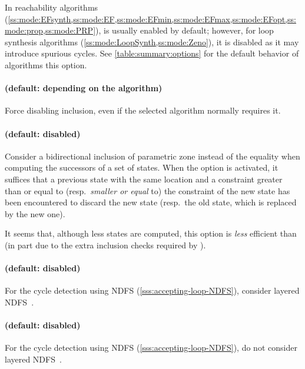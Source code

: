 In reachability algorithms (\cref{ss:mode:EFsynth,ss:mode:EF,ss:mode:EFmin,ss:mode:EFmax,ss:mode:EFopt,ss:mode:prop,ss:mode:PRP}),  is usually enabled by default; however, for loop synthesis algorithms (\cref{ss:mode:LoopSynth,ss:mode:Zeno}), it is disabled as it may introduce spurious cycles.
See \cref{table:summary:options} for the default behavior of algorithms \wrt{} this option.


\paragraph{ (default: depending on the algorithm)}
Force disabling inclusion, even if the selected algorithm normally requires it.


\paragraph{ (default: disabled)}
Consider a bidirectional inclusion of parametric zone instead of the equality when computing the successors of a set of states.
When the  option is activated, it suffices that a previous state with the same location and a constraint greater than or equal to (resp.\ \emph{smaller or equal} to) the constraint of the new state has been encountered to discard the new state (resp.\ the old state, which is replaced by the new one).

It seems that, although less states are computed, this option is \emph{less} efficient than  (in part due to the extra inclusion checks required by ).


\paragraph{ (default: disabled)}
For the cycle detection using NDFS (\cref{sss:accepting-loop-NDFS}), consider layered NDFS~\cite{NPP18}.

\paragraph{ (default: disabled)}
For the cycle detection using NDFS (\cref{sss:accepting-loop-NDFS}), do not consider layered NDFS~\cite{NPP18}.


